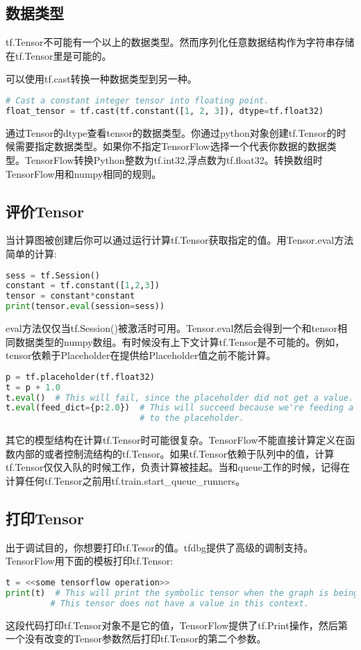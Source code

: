 \subsection{数据类型}
tf.Tensor不可能有一个以上的数据类型。然而序列化任意数据结构作为字符串存储在tf.Tensor里是可能的。

可以使用tf.cast转换一种数据类型到另一种。
\begin{lstlisting}[language=Python]
# Cast a constant integer tensor into floating point.
float_tensor = tf.cast(tf.constant([1, 2, 3]), dtype=tf.float32)
\end{lstlisting}
通过Tensor的dtype查看tensor的数据类型。你通过python对象创建tf.Tensor的时候需要指定数据类型。如果你不指定TensorFlow选择一个代表你数据的数据类型。TensorFlow转换Python整数为tf.int32,浮点数为tf.float32。转换数组时TensorFlow用和numpy相同的规则。
\subsection{评价Tensor}
当计算图被创建后你可以通过运行计算tf.Tensor获取指定的值。用Tensor.eval方法简单的计算:
\begin{lstlisting}[language=Python]
sess = tf.Session()
constant = tf.constant([1,2,3])
tensor = constant*constant
print(tensor.eval(session=sess))
\end{lstlisting}
eval方法仅仅当tf.Session()被激活时可用。Tensor.eval然后会得到一个和tensor相同数据类型的numpy数组。有时候没有上下文计算tf.Tensor是不可能的。例如，tensor依赖于Placeholder在提供给Placeholder值之前不能计算。
\begin{lstlisting}[language=Python]
p = tf.placeholder(tf.float32)
t = p + 1.0
t.eval()  # This will fail, since the placeholder did not get a value.
t.eval(feed_dict={p:2.0})  # This will succeed because we're feeding a value
                           # to the placeholder.
\end{lstlisting}
其它的模型结构在计算tf.Tensor时可能很复杂。TensorFlow不能直接计算定义在函数内部的或者控制流结构的tf.Tensor。如果tf.Tensor依赖于队列中的值，计算tf.Tensor仅仅入队的时候工作，负责计算被挂起。当和queue工作的时候，记得在计算任何tf.Tensor之前用tf.train.start\_queue\_runners。
\subsection{打印Tensor}
出于调试目的，你想要打印tf.Tesor的值。tfdbg提供了高级的调制支持。TensorFlow用下面的模板打印tf.Tensor:
\begin{lstlisting}[language=Python]
t = <<some tensorflow operation>>
print(t)  # This will print the symbolic tensor when the graph is being built.
         # This tensor does not have a value in this context.
\end{lstlisting}
这段代码打印tf.Tensor对象不是它的值，TensorFlow提供了tf.Print操作，然后第一个没有改变的Tensor参数然后打印tf.Tensor的第二个参数。

